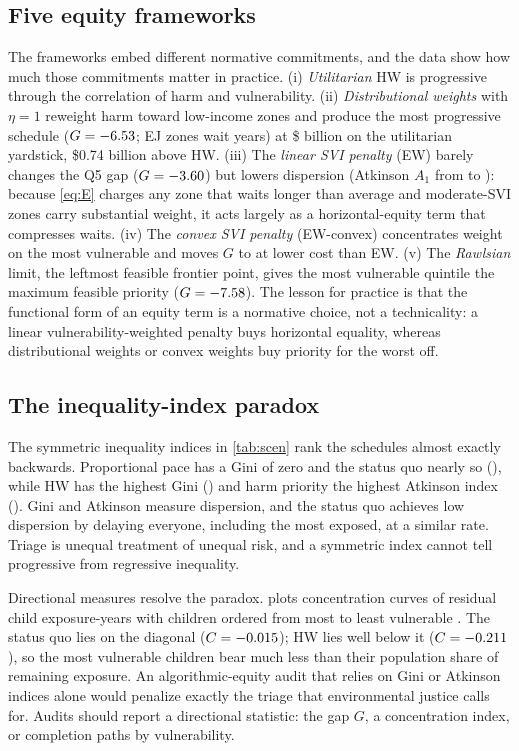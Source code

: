 \subsection{Five equity frameworks}
The frameworks embed different normative commitments, and the data show how much those commitments
matter in practice. (i) \emph{Utilitarian} HW is progressive through the correlation of harm and
vulnerability. (ii) \emph{Distributional weights} with $\eta=1$ reweight harm toward low-income zones
and produce the most progressive schedule ($G=-6.53$; EJ zones wait \DWWaitEJ{} years) at
\$\DWSocial{} billion on the utilitarian yardstick, \$0.74 billion above HW. (iii) The
\emph{linear SVI penalty} (EW) barely changes the Q5 gap ($G=-3.60$) but lowers dispersion
(Atkinson $A_1$ from \HWAtkOne{} to \EWAtkOne): because \cref{eq:E} charges any zone that waits longer
than average and moderate-SVI zones carry substantial weight, it acts largely as a horizontal-equity
term that compresses waits. (iv) The \emph{convex SVI penalty} (EW-convex) concentrates weight on the
most vulnerable and moves $G$ to \ECGap{} at lower cost than EW. (v) The \emph{Rawlsian} limit, the
leftmost feasible frontier point, gives the most vulnerable quintile the maximum feasible priority
($G=-7.58$). The lesson for practice is that the functional form of an equity term is a
normative choice, not a technicality: a linear vulnerability-weighted penalty buys horizontal
equality, whereas distributional weights or convex weights buy priority for the worst off.

\subsection{The inequality-index paradox}\label{sec:paradox}
The symmetric inequality indices in \cref{tab:scen} rank the schedules almost exactly backwards.
Proportional pace has a Gini of zero and the status quo nearly so (\SQGini), while HW has the
highest Gini (\HWGini) and harm priority the highest Atkinson index (\POAtkOne). Gini and Atkinson
measure dispersion, and the status quo achieves low dispersion by delaying everyone, including the
most exposed, at a similar rate. Triage is unequal treatment of unequal risk, and a symmetric index
cannot tell progressive from regressive inequality.

Directional measures resolve the paradox.  plots concentration curves of residual
child exposure-years with children ordered from most to least vulnerable \citep{wagstaff1991}. The
status quo lies on the diagonal ($C=-0.015$); HW lies well below it ($C=-0.211$), so the most
vulnerable children bear much less than their population share of remaining exposure. An
algorithmic-equity audit that relies on Gini or Atkinson indices alone would penalize exactly the
triage that environmental justice calls for. Audits should report a directional statistic: the gap
$G$, a concentration index, or completion paths by vulnerability.

